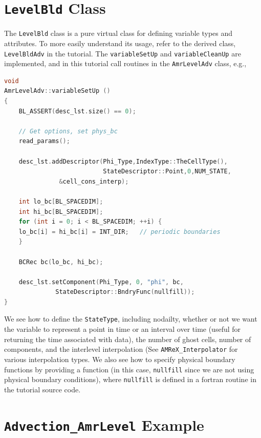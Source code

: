 \section{{\tt LevelBld} Class}
The {\tt LevelBld} class is a pure virtual class for defining variable types
and attributes.  To more easily understand its usage, refer to the derived class,
{\tt LevelBldAdv} in the tutorial.  The {\tt variableSetUp} and {\tt variableCleanUp} are implemented,
and in this tutorial call routines in the {\tt AmrLevelAdv} class, e.g.,
\begin{lstlisting}[language=cpp]
void
AmrLevelAdv::variableSetUp ()
{
    BL_ASSERT(desc_lst.size() == 0);

    // Get options, set phys_bc
    read_params();

    desc_lst.addDescriptor(Phi_Type,IndexType::TheCellType(),
                           StateDescriptor::Point,0,NUM_STATE,
			   &cell_cons_interp);

    int lo_bc[BL_SPACEDIM];
    int hi_bc[BL_SPACEDIM];
    for (int i = 0; i < BL_SPACEDIM; ++i) {
	lo_bc[i] = hi_bc[i] = INT_DIR;   // periodic boundaries
    }
    
    BCRec bc(lo_bc, hi_bc);

    desc_lst.setComponent(Phi_Type, 0, "phi", bc, 
			  StateDescriptor::BndryFunc(nullfill));
}
\end{lstlisting}
We see how to define the {\tt StateType}, including nodailty, whether or not we want
the variable to represent a point in time or an interval over time (useful for returning
the time associated with data), the number of ghost cells, number of components,
and the interlevel interpolation (See {\tt AMReX\_Interpolator} for various interpolation
types.  We also see how to specify physical boundary functions by providing a function (in this case,
{\tt nullfill} since we are not using physical boundary conditions), where {\tt nullfill} is
defined in a fortran routine in the tutorial source code.

\section{{\tt Advection\_AmrLevel} Example}

